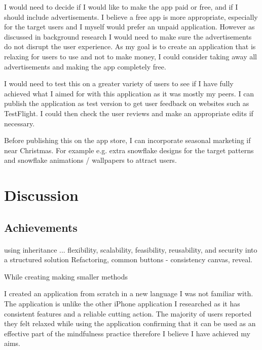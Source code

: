 \documentclass[11pt]{article}
\begin{document}
        I would need to decide if I would like to make the app paid or free, and if I should include advertisements. I believe a free app is more appropriate, especially for the target users and I myself would prefer an unpaid application. However as discussed in background research I would need to make sure the advertisements do not disrupt the user experience. As my goal is to create an application that is relaxing for users to use and not to make money, I could consider taking away all advertisements and making the app completely free.
        
        I would need to test this on a greater variety of users to see if I have fully achieved what I aimed for with this application as it was mostly my peers.  I can publish the application as test version to get user feedback on websites such as TestFlight. %
        I could then check the user reviews and make an appropriate edits if necessary. 
        
        Before publishing this on the app store, I can incorporate seasonal marketing if near Christmas. For example e.g. extra snowflake designs for the target patterns and snowflake animations / wallpapers to attract users.
        
        
\newpage
\section{Discussion}
    \subsection{Achievements}
        \paragraph{}
        using inheritance ... 
         flexibility, scalability, feasibility, reusability, and security into a structured solution
         Refactoring, 
         common buttons - consistency
         canvas, reveal. 
        
        While creating making smaller methods
        
        I created an application from scratch in a new language I was not familiar with. The application is unlike the other iPhone application I researched as it has consistent features and a reliable cutting action. The majority of users reported they felt relaxed while using the application confirming that it can be used as an effective part of the mindfulness practice therefore I believe I have achieved my aims. 
        
\end{document}
